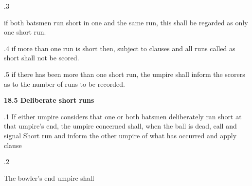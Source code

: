 \documentclass[12pt]{article}
\begin{document}
\vspace{\baselineskip}
{\fontsize{9pt}{10.8pt}.3 \tabto{0.49in} {\fontsize{8pt}{9.6pt}\selectfont if both batsmen run short in one and the same run, this shall be regarded as only one short run.\par}\par}\par


\vspace{\baselineskip}
\begin{adjustwidth}{0.5in}{0.11in}
{\fontsize{9pt}{10.8pt}.4 \tabto{0.49in} if more than one run is short then, subject to clauses and all runs called as short shall not be scored.\par}\par

\end{adjustwidth}


\vspace{\baselineskip}
\begin{adjustwidth}{0.5in}{0.01in}
{\fontsize{9pt}{10.8pt}.5 \tabto{0.49in} if there has been more than one short run, the umpire shall inform the scorers as to the number of runs to be recorded.\par}\par

\end{adjustwidth}


\vspace{\baselineskip}
{\fontsize{11pt}{13.2pt}\selectfont \textbf{18.5 \tabto{0.47in} Deliberate short runs}\par}\par


\vspace{\baselineskip}
\begin{adjustwidth}{0.5in}{0.18in}
\begin{justify}
{\fontsize{9pt}{10.8pt}.1 \tabto{0.49in} If either umpire considers that one or both batsmen deliberately ran short at that umpire’s end, the umpire concerned shall, when the ball is dead, call and signal Short run and inform the other umpire of what has occurred and apply clause \par}
\end{justify}\par

\end{adjustwidth}


\vspace{\baselineskip}
{\fontsize{9pt}{10.8pt}.2 \tabto{0.49in} {\fontsize{8pt}{9.6pt}\selectfont The bowler’s end umpire shall\par}\par}\par
\end{document}

